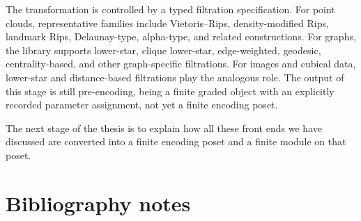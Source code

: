 \documentclass[11pt]{article}
\theoremstyle{definition}
\theoremstyle{remark}
\begin{document}
The transformation is controlled by a typed filtration specification.  For point clouds, representative families include Vietoris--Rips, density-modified Rips, landmark Rips, Delaunay-type, alpha-type, and related constructions.  For graphs, the library supports lower-star, clique lower-star, edge-weighted, geodesic, centrality-based, and other graph-specific filtrations.  For images and cubical data, lower-star and distance-based filtrations play the analogous role.  The output of this stage is still pre-encoding, being a finite graded object with an explicitly recorded parameter assignment, not yet a finite encoding poset.

The next stage of the thesis is to explain how all these front ends we have discussed are converted into a finite encoding poset and a finite module on that poset.



\section{Bibliography notes}\label{app:bibliography-notes}
\end{document}
